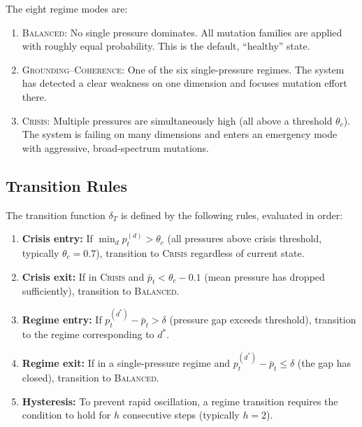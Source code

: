 The eight regime modes are:

\begin{enumerate}[leftmargin=1.8em]
  \item \textsc{Balanced}: No single pressure dominates. All mutation families are applied with roughly equal probability. This is the default, ``healthy'' state.

  \item \textsc{Grounding}--\textsc{Coherence}: One of the six single-pressure regimes. The system has detected a clear weakness on one dimension and focuses mutation effort there.

  \item \textsc{Crisis}: Multiple pressures are simultaneously high (all above a threshold $\theta_c$). The system is failing on many dimensions and enters an emergency mode with aggressive, broad-spectrum mutations.
\end{enumerate}

\subsection{Transition Rules}

The transition function $\delta_T$ is defined by the following rules, evaluated in order:

\begin{enumerate}[leftmargin=1.8em]
  \item \textbf{Crisis entry:} If $\min_d p_t^{(d)} > \theta_c$ (all pressures above crisis threshold, typically $\theta_c = 0.7$), transition to \textsc{Crisis} regardless of current state.

  \item \textbf{Crisis exit:} If in \textsc{Crisis} and $\bar{p}_t < \theta_c - 0.1$ (mean pressure has dropped sufficiently), transition to \textsc{Balanced}.

  \item \textbf{Regime entry:} If $p_t^{(d^*)} - \bar{p}_t > \delta$ (pressure gap exceeds threshold), transition to the regime corresponding to $d^*$.

  \item \textbf{Regime exit:} If in a single-pressure regime and $p_t^{(d^*)} - \bar{p}_t \leq \delta$ (the gap has closed), transition to \textsc{Balanced}.

  \item \textbf{Hysteresis:} To prevent rapid oscillation, a regime transition requires the condition to hold for $h$ consecutive steps (typically $h = 2$).
\end{enumerate}

